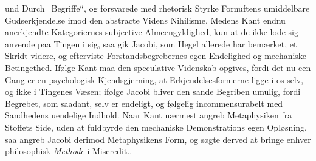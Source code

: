 \documentclass[12pt]{book}
\begin{document}
und Durch=Begriffe“, og forsvarede med rhetorisk Styrke Fornuftens umiddelbare
Gudserkjendelse imod den abstracte Videns Nihilisme. Medens Kant endnu anerkjendte
Kategoriernes subjective Almeengyldighed, kun at de ikke lode sig anvende paa Tingen
i sig, saa gik Jacobi, som Hegel allerede har bemærket, et Skridt videre, og
efterviste Forstandsbegrebernes egen Endelighed og mechaniske Betingethed. Ifølge
Kant maa den speculative Videnskab opgives, fordi det nu een Gang er en psychologisk
Kjendsgjerning, at Erkjendelsesformerne ligge i os selv, og ikke i Tingenes Væsen;
ifølge Jacobi bliver den sande Begriben umulig, fordi Begrebet, som saadant, selv er
endeligt, og følgelig incommensurabelt med Sandhedens uendelige Indhold. Naar Kant
nærmest angreb Metaphysiken fra Stoffets Side, uden at fuldbyrde den mechaniske
Demonstrations egen Opløsning, saa angreb Jacobi derimod Metaphysikens Form, og søgte
derved at bringe enhver philosophisk \emph{Methode} i Miscredit..
\end{document}
